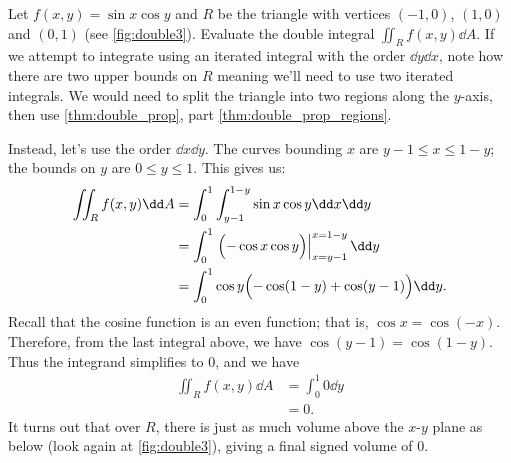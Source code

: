 \begin{example}\label{ex_double3}
Let $f(x,y) = \sin x\cos y$ and $R$ be the triangle with vertices $(-1,0)$, $(1,0)$ and $(0,1)$ (see \autoref{fig:double3}). Evaluate the double integral $\iint_Rf(x,y)\dd A$.
%
\solution
If we attempt to integrate using an iterated integral with the order $\dd y\dd x$, note how there are two upper bounds on $R$ meaning we'll need to use two iterated integrals. We would need to split the triangle into two regions along the $y$-axis, then use \autoref{thm:double_prop}, part \ref{thm:double_prop_regions}.

Instead, let's use the order $\dd x\dd y$. The curves bounding $x$ are $y-1\leq x\leq 1-y$; the bounds on $y$ are $0\leq y\leq 1$. This gives us:
\begin{align*}
\iint_R f(x,y)\dd A &= \int_0^1\int_{y-1}^{1-y}\sin x\cos y\dd x\dd y\\
		&= \int_0^1\left.\Bigl( -\cos x\cos y\Bigr)\right|_{x=y-1}^{x=1-y}\dd y\\
		&= \int_0^1 \cos y\Bigl(-\cos (1-y) + \cos(y-1)\Bigr)\dd y.
\end{align*}
Recall that the cosine function is an even function; that is, $\cos x = \cos (-x)$. Therefore, from the last integral above, we have $\cos (y-1) = \cos (1-y)$. Thus the integrand simplifies to 0, and we have 
\begin{align*}
\iint_R f(x,y)\dd A &= \int_0^1 0\dd y \\
&= 0.
\end{align*}
It turns out that over $R$, there is just as much volume above the $x$-$y$ plane as below (look again at \autoref{fig:double3}), giving a final signed volume of 0.
\end{example}

